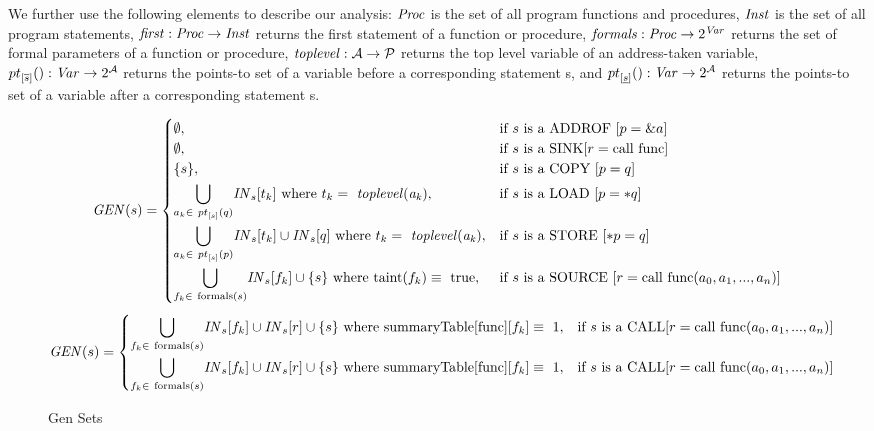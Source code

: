 We further use the following elements to describe our analysis:
$\mathit{Proc}$ is the set of all program functions and procedures,
$\mathit{Inst}$ is the set of all program statements,
$\mathit{first}{}: \mathit{Proc} \rightarrow \mathit{Inst}$ returns the first
statement of a function or procedure,
$\mathit{formals}{}: \mathit{Proc} \rightarrow 2^{\mathit{Var}}$ returns the
set of formal parameters of a function or procedure, 
$\mathit{toplevel}{}: \mathcal{A} \rightarrow \mathcal{P}$ returns the top level
variable of an address-taken variable,
${pt}_{[\overline{s}] }(): \mathit{Var} \rightarrow 2^{\mathcal{A}}$ returns the
points-to set of a variable before a corresponding statement s,
and ${pt}_{[\underline{s}]}(): \mathit{Var} \rightarrow 2^{\mathcal{A}}$ returns the
points-to set of a variable after a corresponding statement s.

\begin{figure*}
\[
	\mathit{GEN}(s)	=	
	\begin{cases}
		\emptyset,	&\text{if $s$ is a \addrofdef}	\\
		
		\emptyset,	&\text{if $s$ is a \sinkdef}	\\
			
		\set{s},	&\text{if $s$ is a \copydef}	\\
				
		\mybigcup{a_k \in\ \pointsto{s}{q}}{} \myinflow{}_s[t_k]\ \text{where}\ t_k =\ \mathit{toplevel(a_k)},
			&\text{if $s$ is a \loaddef}	\\		
			
		\mybigcup{a_k \in\ \pointsto{s}{p}}{} \myinflow{}_s[t_k] \cup \myinflow{}_s[q]\ \text{where}\ t_k =\ \mathit{toplevel(a_k)},	
			&\text{if $s$ is a \storedef}	\\
			
		\mybigcup{f_k \in\ \text{formals}(s)}{} \myinflow{}_s[f_k] \cup \set{s}\ \text{where}\ \text{taint}(f_k) \equiv\ \text{true},	
			&\text{if $s$ is a \sourcedef}	
	\end{cases}
\]
\[	
	\mathit{GEN}(s) =
	\begin{cases}			
		\mybigcup{f_k \in\ \text{formals}(s)}{} \myinflow{}_s[f_k] \cup \myinflow{}_s[r] \cup \set{s}\ \text{where}\ \text{summaryTable}[\text{func}][f_k] \equiv\ 1,	
			&\text{if $s$ is a \calldef}	\\							
		\mybigcup{f_k \in\ \text{formals}(s)}{} \myinflow{}_s[f_k] \cup \myinflow{}_s[r] \cup \set{s}\ \text{where}\ \text{summaryTable}[\text{func}][f_k] \equiv\ 1,	
			&\text{if $s$ is a \calldef}								
	\end{cases}
\]
\caption{Gen Sets}
\end{figure*}

